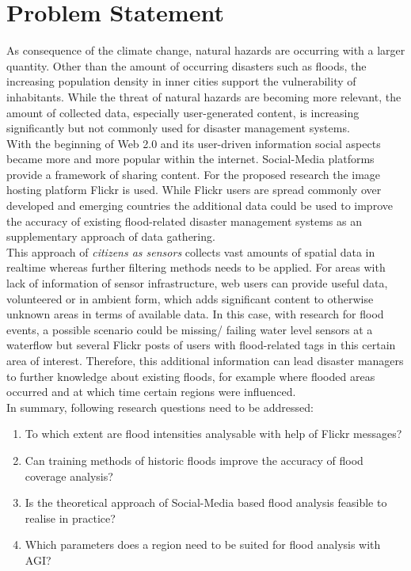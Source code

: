 \section{Problem Statement}

As consequence of the climate change, natural hazards are occurring with a larger quantity. Other than the amount of occurring disasters such  as floods, the increasing population density in inner cities support the vulnerability of inhabitants. While the threat of natural hazards are becoming more relevant, the amount of collected data, especially user-generated content, is increasing significantly but not commonly used for disaster management systems. \\
With the beginning of Web 2.0 and its user-driven information social aspects became more and more popular within the internet. Social-Media platforms provide a framework of sharing content. For the proposed research the image hosting platform Flickr is used. While Flickr users are spread commonly over developed and emerging countries the additional data could be used to improve the accuracy of existing flood-related disaster management systems as an supplementary approach of data gathering. \\
This approach of \textit{citizens as sensors} collects vast amounts of spatial data in realtime whereas further filtering methods needs to be applied. For areas with lack of information of sensor infrastructure, web users can provide useful data, volunteered or in ambient form, which adds significant content to otherwise unknown areas in terms of available data. In this case, with research for flood events, a possible scenario could be missing/ failing water level sensors at a waterflow but several Flickr posts of users with flood-related tags in this certain area of interest. Therefore, this additional information can lead disaster managers to further knowledge about existing floods, for example where flooded areas occurred and at which time certain regions were influenced. \\
In summary, following research questions need to be addressed:
\begin{enumerate}
\item To which extent are flood intensities analysable with help of Flickr messages?
\item Can training methods of historic floods improve the accuracy of flood coverage analysis?
\item Is the theoretical approach of Social-Media based flood analysis feasible to realise in practice?
\item Which parameters does a region need to be suited for flood analysis with AGI?
\end{enumerate}

	